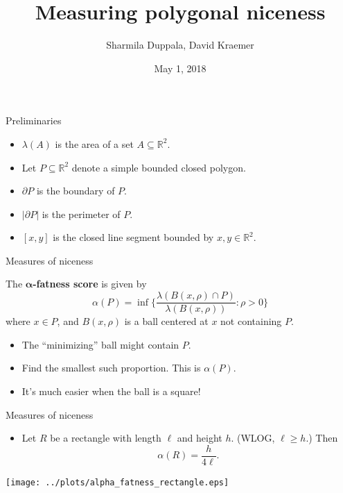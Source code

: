 \documentclass[]{beamer}
\title{Measuring polygonal niceness}
\author[Duppala, Kraemer]{%
Sharmila Duppala\inst{1}, %
David Kraemer\inst{1}}
\institute[Stony Brook University]
{
  \inst{1}%
  AMS 545: Computational Geometry \\
  Stony Brook University
}
\date[2018]{May 1, 2018}
\newcommand{\RR}{\mathbb{R}}
\newcommand{\abs}[1]{|#1|}
\newcommand{\set}[1]{\{ #1 \}}
\newcommand{\defkey}{\textbf}
\begin{document}
\frame{\titlepage}

\begin{frame}[t]{Preliminaries}
  \begin{itemize}
    \item $\lambda(A)$ is the area of a set $A \subseteq \RR^2$.
    \item Let $P \subseteq \RR^2$ denote a simple bounded closed polygon.
    \item $\partial P$ is the boundary of $P$.
    \item $\abs{\partial P}$ is the perimeter of $P$.
    \item $[x,y]$ is the closed line segment bounded by $x,y \in \RR^2$.
  \end{itemize}
\end{frame}

\begin{frame}[t]{Measures of niceness}
  \begin{definition}
    The \defkey{$\bm{\alpha}$-fatness score} is given by
    \begin{equation*}
      \alpha(P) = \inf\set{
        \frac{\lambda(B(x, \rho) \cap P)}{\lambda(B(x, \rho))} : \rho > 0
      }
    \end{equation*}
    where $x \in P$, and $B(x,\rho)$ is a ball centered at
    $x$ not containing $P$.
  \end{definition}
  \begin{itemize}
    \item The ``minimizing'' ball might contain $P$.
    \item Find the smallest such proportion. This is $\alpha(P)$.
    \item It's much easier when the ball is a square!
  \end{itemize}
\end{frame}

\begin{frame}[t]{Measures of niceness}
  \begin{itemize}
    \item Let $R$ be a rectangle with length $\ell$ and height $h$. (WLOG, $\ell
      \geq h$.) Then
      \begin{equation*}
        \alpha(R) = \frac{h}{4\ell}.
      \end{equation*}
  \end{itemize}
  \begin{center}
    \texttt{[image: ../plots/alpha\_fatness\_rectangle.eps]}
  \end{center}
\end{frame}
\end{document}
